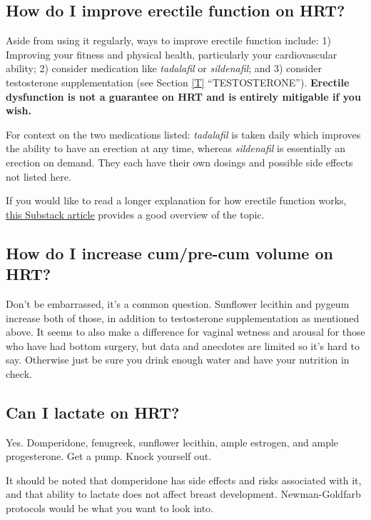 \documentclass{article}
\begin{document}
\subsection{How do I improve erectile function on HRT?}\label{11-20}

Aside from using it regularly, ways to improve erectile function include: 1) Improving your fitness and physical health, particularly your cardiovascular ability; 2) consider medication like \textit{tadalafil} or \textit{sildenafil}; and 3) consider testosterone supplementation (see Section \ref{T} “TESTOSTERONE”). \textbf{Erectile dysfunction is not a guarantee on HRT and is entirely mitigable if you wish.}

For context on the two medications listed: \textit{tadalafil} is taken daily which improves the ability to have an erection at any time, whereas \textit{sildenafil} is essentially an erection on demand. They each have their own dosings and possible side effects not listed here.

If you would like to read a longer explanation for how erectile function works, \href{https://stainedglasswoman.substack.com/p/how-to-maintain-your-penis-function}{this Substack article} provides a good overview of the topic.

\subsection{How do I increase cum/pre-cum volume on HRT?}

Don’t be embarrassed, it’s a common question. Sunflower lecithin and pygeum increase both of those, in addition to testosterone supplementation as mentioned above. It seems to also make a difference for vaginal wetness and arousal for those who have had bottom surgery, but data and anecdotes are limited so it’s hard to say. Otherwise just be sure you drink enough water and have your nutrition in check.

\subsection{Can I lactate on HRT?}

Yes. Domperidone, fenugreek, sunflower lecithin, ample estrogen, and ample progesterone. Get a pump. Knock yourself out.

It should be noted that domperidone has side effects and risks associated with it, and that ability to lactate does not affect breast development. Newman-Goldfarb protocols would be what you want to look into.
\end{document}

